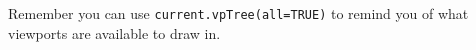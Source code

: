 % 
% 
% 
% 
% 
% 
Remember you can use {\tt current.vpTree(all=TRUE)} to remind you of what viewports are available to draw in.



